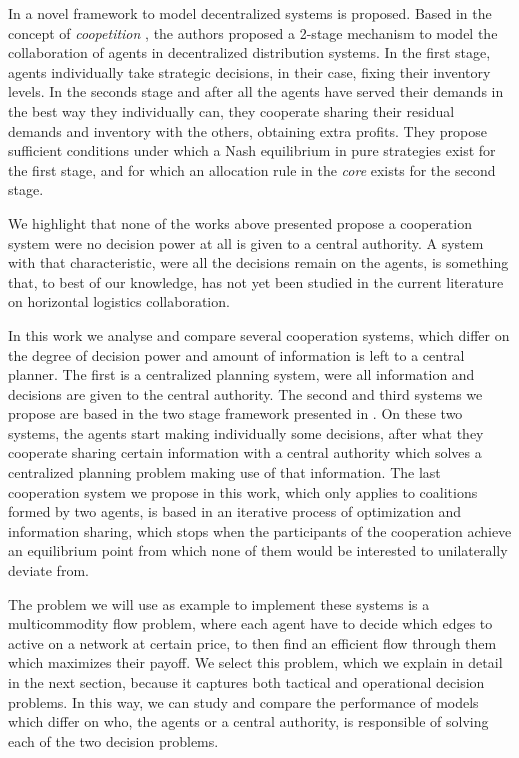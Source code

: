 \documentclass{article}
\begin{document}
In \textcite{ANUPINDI2001} a novel framework to model decentralized systems is proposed. Based in the concept of \emph{coopetition} \parencite{BRANDENBURGER1996},
the authors proposed a 2-stage mechanism to model the collaboration of agents in
decentralized distribution systems. In the first stage, agents individually
take strategic decisions, in their case, fixing their inventory levels. In the
seconds stage and after all the agents have served their demands in the best way they individually can, they cooperate sharing their residual demands and inventory with the others, obtaining extra profits. They propose sufficient conditions under which a Nash equilibrium in pure strategies exist for the first stage, and for which an allocation rule in the \emph{core} exists for the second stage.

We highlight that none of the works above presented propose a cooperation system were no decision power at all is given to a central authority. A system with that characteristic, were all the decisions remain on the agents, is something that, to best of our knowledge, has not yet been studied in the current literature on horizontal logistics collaboration.


In this work we analyse and compare several cooperation systems, which differ on the degree of decision power and amount of information is left to a central planner. The first is a centralized planning system, were all information and decisions are given to the central authority. The second and third systems we propose are based in the two stage framework presented in  \textcite{ANUPINDI2001}. On these two systems, the agents start  making individually some decisions, after what they cooperate sharing certain information with a central authority which solves a centralized planning problem making use of that information. The last cooperation system we propose in this work, which only applies to coalitions formed by two agents, is based in an iterative process of optimization and information sharing, which stops when the participants of the cooperation achieve an equilibrium point from which none of them would be interested to unilaterally deviate from. 

The problem we will use as example to implement these systems is a multicommodity flow problem, where each agent have to decide which edges to active on a network at certain price, to then find an efficient flow through them which maximizes their payoff. We select this problem, which we explain in detail in the next section, because it captures both tactical and operational decision problems. In this way, we can study and compare the performance of models which differ on who, the agents or a central authority, is responsible of solving each of the two decision problems.
\end{document}
